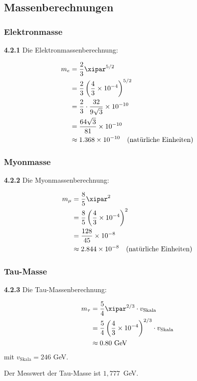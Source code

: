 	\subsection{Massenberechnungen}
	
	\subsubsection{Elektronmasse}
	
	\noindent \textbf{4.2.1} Die Elektronmassenberechnung:
	\begin{keyresult}
		\begin{align}
			m_e &= \frac{2}{3} \xipar^{5/2} \\
			&= \frac{2}{3} \left( \frac{4}{3} \times 10^{-4} \right)^{5/2} \\
			&= \frac{2}{3} \cdot \frac{32}{9 \sqrt{3}} \times 10^{-10} \\
			&= \frac{64 \sqrt{3}}{81} \times 10^{-10} \\
			&\approx 1.368 \times 10^{-10} \quad \text{(natürliche Einheiten)}
		\end{align}
	\end{keyresult}
	
	\subsubsection{Myonmasse}
	
	\noindent \textbf{4.2.2} Die Myonmassenberechnung:
	\begin{keyresult}
		\begin{align}
			m_\mu &= \frac{8}{5} \xipar^{2} \\
			&= \frac{8}{5} \left( \frac{4}{3} \times 10^{-4} \right)^{2} \\
			&= \frac{128}{45} \times 10^{-8} \\
			&\approx 2.844 \times 10^{-8} \quad \text{(natürliche Einheiten)}
		\end{align}
	\end{keyresult}
	
	\subsubsection{Tau-Masse}
	
	\noindent \textbf{4.2.3} Die Tau-Massenberechnung:
	\begin{keyresult}
		\begin{align}
			m_\tau &= \frac{5}{4} \xipar^{2/3} \cdot v_{\text{Skala}} \\
			&= \frac{5}{4} \left( \frac{4}{3} \times 10^{-4} \right)^{2/3} \cdot v_{\text{Skala}} \\
			&\approx 0.80 \text{ GeV}
		\end{align}
		mit $v_{\text{Skala}} = 246$ GeV.
	\end{keyresult}
	Der Messwert der Tau-Masse ist $1{,}777$~GeV.

